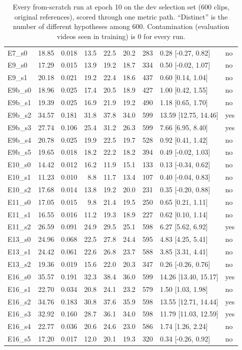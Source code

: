 \documentclass[11pt,twocolumn,a4paper]{article}
\begin{document}
\begin{table}[H]
\begin{tabular}{lrrrrrrll}
E7\_s0 & 18.85 & 0.018 & 13.5 & 22.5 & 20.2 & 283 & 0.28 [-0.27, 0.82] & no \\
E9\_s0 & 17.29 & 0.015 & 13.9 & 19.2 & 18.7 & 334 & 0.50 [-0.02, 1.07] & no \\
E9\_s1 & 20.18 & 0.021 & 19.2 & 22.4 & 18.6 & 437 & 0.60 [0.14, 1.04] & no \\
E9b\_s0 & 18.96 & 0.025 & 17.4 & 20.5 & 18.9 & 427 & 1.00 [0.42, 1.55] & no \\
E9b\_s1 & 19.39 & 0.025 & 16.9 & 21.9 & 19.2 & 490 & 1.18 [0.65, 1.70] & no \\
E9b\_s2 & 34.57 & 0.181 & 31.8 & 37.8 & 34.0 & 599 & 13.59 [12.75, 14.46] & yes \\
E9b\_s3 & 27.74 & 0.106 & 25.4 & 31.2 & 26.3 & 599 & 7.66 [6.95, 8.40] & yes \\
E9b\_s4 & 20.78 & 0.025 & 19.9 & 22.5 & 19.7 & 528 & 0.92 [0.41, 1.42] & no \\
E9b\_s5 & 19.65 & 0.018 & 18.2 & 22.2 & 18.2 & 394 & 0.49 [-0.02, 1.03] & no \\
E10\_s0 & 14.42 & 0.012 & 16.2 & 11.9 & 15.1 & 133 & 0.13 [-0.34, 0.62] & no \\
E10\_s1 & 11.23 & 0.010 & 8.8 & 11.7 & 13.4 & 107 & 0.40 [-0.04, 0.83] & no \\
E10\_s2 & 17.68 & 0.014 & 13.8 & 19.2 & 20.0 & 231 & 0.35 [-0.20, 0.88] & no \\
E11\_s0 & 17.05 & 0.015 & 9.8 & 21.4 & 19.5 & 250 & 0.65 [0.21, 1.11] & no \\
E11\_s1 & 16.55 & 0.016 & 11.2 & 19.3 & 18.9 & 227 & 0.62 [0.10, 1.14] & no \\
E11\_s2 & 26.59 & 0.091 & 24.9 & 29.5 & 25.1 & 598 & 6.27 [5.62, 6.92] & yes \\
E13\_s0 & 24.96 & 0.068 & 22.5 & 27.8 & 24.4 & 595 & 4.83 [4.25, 5.41] & no \\
E13\_s1 & 24.42 & 0.061 & 22.6 & 26.8 & 23.7 & 588 & 3.85 [3.31, 4.41] & no \\
E13\_s2 & 19.36 & 0.019 & 15.6 & 22.0 & 20.3 & 347 & 0.26 [-0.26, 0.76] & no \\
E16\_s0 & 35.57 & 0.191 & 32.3 & 38.4 & 36.0 & 599 & 14.26 [13.40, 15.17] & yes \\
E16\_s1 & 22.70 & 0.034 & 20.8 & 24.1 & 23.2 & 579 & 1.50 [1.03, 1.98] & no \\
E16\_s2 & 34.76 & 0.183 & 30.8 & 37.6 & 35.9 & 598 & 13.55 [12.71, 14.44] & yes \\
E16\_s3 & 32.92 & 0.160 & 28.7 & 36.1 & 34.0 & 598 & 11.79 [11.03, 12.59] & yes \\
E16\_s4 & 22.77 & 0.036 & 20.6 & 24.6 & 23.0 & 586 & 1.74 [1.26, 2.24] & no \\
E16\_s5 & 17.20 & 0.017 & 12.0 & 20.1 & 19.3 & 320 & 0.34 [-0.26, 0.92] & no \\
\bottomrule
\end{tabular}
\caption{Every from-scratch run at epoch 10 on the dev selection set (600 clips, original references), scored through one metric path. ``Distinct'' is the number of different hypotheses among 600. Contamination (evaluation videos seen in training) is 0 for every run.}
\end{table}
\end{document}
